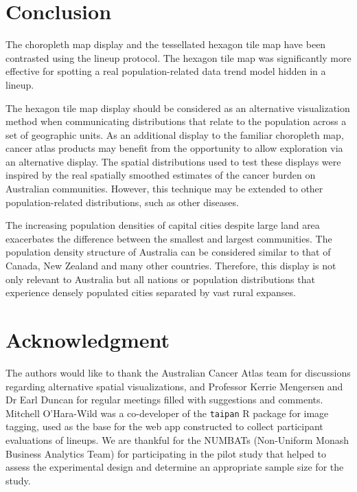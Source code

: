 \documentclass[times, doublespace]{anzsauth}
\begin{document}
\section{Conclusion}\label{conclusion}

The choropleth map display and the tessellated hexagon tile map have
been contrasted using the lineup protocol. The hexagon tile map was
significantly more effective for spotting a real population-related data
trend model hidden in a lineup.

The hexagon tile map display should be considered as an alternative
visualization method when communicating distributions that relate to the
population across a set of geographic units. As an additional display to
the familiar choropleth map, cancer atlas products may benefit from the
opportunity to allow exploration via an alternative display. The spatial
distributions used to test these displays were inspired by the real
spatially smoothed estimates of the cancer burden on Australian
communities. However, this technique may be extended to other population-related distributions, such as other diseases.

The increasing population densities of capital cities despite large land
area exacerbates the difference between the smallest and largest communities.
The population density structure of Australia can be considered similar
to that of Canada, New Zealand and many other countries. Therefore, this
display is not only relevant to Australia but all nations or population
distributions that experience densely populated cities separated by vast
rural expanses.

\section{Acknowledgment}\label{acknowledgment}

The authors would like to thank the Australian Cancer Atlas team for
discussions regarding alternative spatial visualizations, and Professor
Kerrie Mengersen and Dr Earl Duncan for regular meetings filled with
suggestions and comments. Mitchell O'Hara-Wild was a co-developer of the
 \texttt{taipan} \citep{taipan} R package for image tagging, used
as the base for the web app constructed to collect participant
evaluations of lineups. We are thankful for the NUMBATs (Non-Uniform
Monash Business Analytics Team) for participating in the pilot study
that helped to assess the experimental design and determine an
appropriate sample size for the study.
\end{document}
